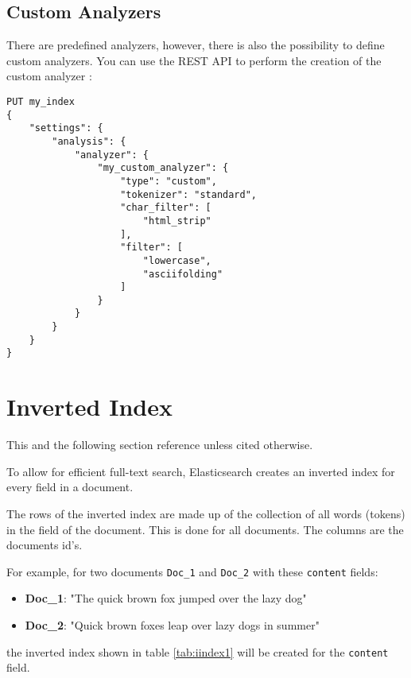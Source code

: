 \subsection{Custom Analyzers}
There are predefined analyzers, however, there is also the possibility to define custom analyzers. You can use the REST API to perform the creation of the custom analyzer \autocite{elasticsearch_analc}:

\begin{minipage}[c]{0.95\textwidth}
    \begin{lstlisting}
PUT my_index
{
    "settings": {
        "analysis": {
            "analyzer": {
                "my_custom_analyzer": {
                    "type": "custom", 
                    "tokenizer": "standard",
                    "char_filter": [
                        "html_strip"
                    ],
                    "filter": [
                        "lowercase",
                        "asciifolding"
                    ]
                }
            }
        }
    }
}
    \end{lstlisting}
\end{minipage}

\section{Inverted Index}
This and the following section reference \autocite{elasticsearch_iindex} unless cited otherwise.

To allow for efficient full-text search, Elasticsearch creates an inverted index for every field in a document.

The rows of the inverted index are made up of the collection of all words (tokens) in the field of the document. This is done for all documents. The columns are the documents id's.

For example, for two documents \texttt{Doc\_1} and \texttt{Doc\_2} with these \texttt{content} fields:
\begin{itemize}
    \item \textbf{Doc\_1}: "The quick brown fox jumped over the lazy dog"
    \item \textbf{Doc\_2}: "Quick brown foxes leap over lazy dogs in summer"
\end{itemize}

the inverted index shown in table \ref{tab:iindex1} will be created for the \texttt{content} field.

